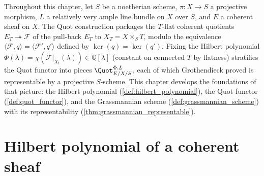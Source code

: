 Throughout this chapter, let \(S\) be a noetherian scheme, \(\pi : X \to S\) a
projective morphism, \(L\) a relatively very ample line bundle on \(X\) over \(S\),
and \(E\) a coherent sheaf on \(X\). The Quot construction packages the
\(T\)-flat coherent quotients \(E_T \twoheadrightarrow \mathcal{F}\) of the
pull-back \(E_T\) to \(X_T = X \times_S T\), modulo the equivalence
\(\langle \mathcal{F}, q\rangle = \langle \mathcal{F}', q'\rangle\) defined by
\(\ker(q) = \ker(q')\). Fixing the Hilbert polynomial
\(\Phi(\lambda) = \chi(\mathcal{F}|_{X_t}(\lambda)) \in \mathbb{Q}[\lambda]\)
(constant on connected \(T\) by flatness)
stratifies the Quot functor into pieces \(\Quot^{\Phi,L}_{E/X/S}\), each of
which Grothendieck proved is representable by a projective \(S\)-scheme.
This chapter develops the foundations of that picture: the Hilbert
polynomial (\cref{def:hilbert_polynomial}), the Quot functor
(\cref{def:quot_functor}), and the Grassmannian scheme
(\cref{def:grassmannian_scheme}) with its representability
(\cref{thm:grassmannian_representable}).


\section{Hilbert polynomial of a coherent sheaf}
\label{sec:hilbert_polynomial}

